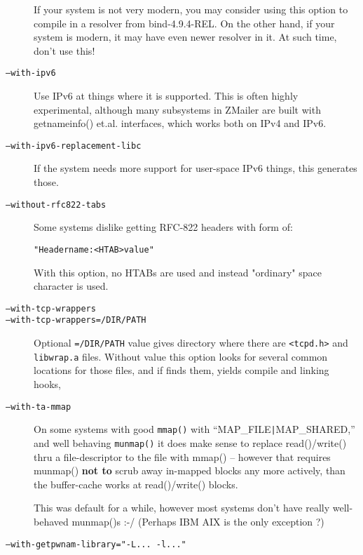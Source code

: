 \begin{description}
If your system is not very modern, you may consider using
this option to compile in a resolver from bind-4.9.4-REL.
On the other hand, if your system is modern, it may have
even newer resolver in it.  At such time, don't use this!

\item[\tt --with-ipv6] \mbox{}

Use IPv6 at things where it is supported.  This is often
highly experimental, although many subsystems in ZMailer
are built with   getnameinfo()  et.al. interfaces, which
works both on IPv4 and IPv6.

\item[\tt --with-ipv6-replacement-libc] \mbox{}

If the system needs more support for user-space IPv6
things, this generates those.

\item[\tt --without-rfc822-tabs] \mbox{}

Some systems dislike getting RFC-822 headers with form of:
\begin{alltt}
   "Headername: <HTAB> value"
\end{alltt}
With this option, no HTABs are used and instead "ordinary"
space character is used.

\item[\tt --with-tcp-wrappers]
\item[\tt --with-tcp-wrappers=/DIR/PATH] \mbox{}

Optional  {\tt =/DIR/PATH}  value gives directory where there are
{\tt <tcpd.h>}  and  {\tt libwrap.a}  files.
Without value this option looks for several common locations
for those files, and if finds them, yields compile and linking
hooks,

\item[\tt --with-ta-mmap] \mbox{}

On some systems with good {\tt mmap()} with ``MAP\_FILE\verb/|/MAP\_SHARED,''
and well behaving  {\tt munmap()}  it does make sense to replace
read()/write() thru a file-descriptor to the file with
mmap() -- however that requires munmap() {\bf not to} scrub
away in-mapped blocks any more actively, than the buffer-cache
works at read()/write() blocks.

This was default for a while, however most systems don't
have really well-behaved munmap()s :-/
(Perhaps IBM AIX is the only exception ?)

\item[\tt --with-getpwnam-library="-L... -l..."] \mbox{}


\end{description}
